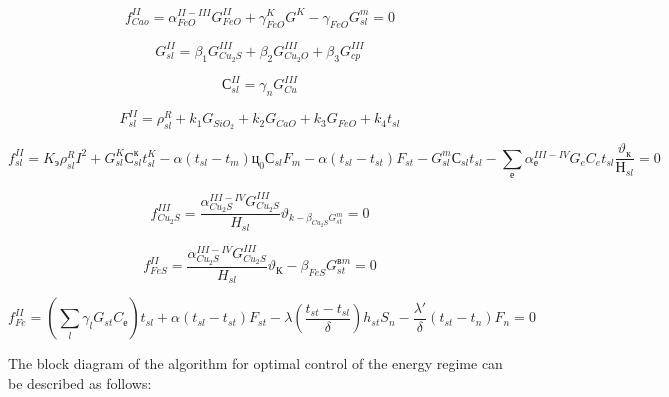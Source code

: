 \begin{equation}
f_{Cao}^{II} = \alpha_{FeO}^{II - III}G_{FeO}^{II} + \gamma_{FeO}^{K}G^{K} - \gamma_{FeO}G_{sl}^{m} = 0
\end{equation}

\begin{equation}
G_{sl}^{II} = \beta_{1}G_{Cu_{2}S}^{III} + \beta_{2}G_{Cu_{2}O}^{III} + \beta_{3}G_{cp}^{III}
\end{equation}

\begin{equation}
С_{sl}^{II} = \gamma_{n}G_{Cu}^{III}
\end{equation}

\begin{equation}
F_{sl}^{II} = \rho_{sl}^{R} + k_{1}G_{SiO_{2}} + k_{2}G_{CaO} + k_{3}G_{FeO} + k_{4}t_{sl}
\end{equation}

\begin{equation}
f_{sl}^{II} = K_{э}\rho_{sl}^{R}I^{2} + G_{sl}^{K}С_{sl}^{к}t_{sl}^{K} - \alpha(t_{sl} - t_{m})ц_{0}С_{sl}F_{m} - \alpha(t_{sl} - t_{st})F_{st} - G_{sl}^{m}С_{sl}t_{sl} - \sum_{е}^{}\alpha_{е}^{III - IV}G_{e}C_{e}t_{sl}\frac{\vartheta_{к}}{Н_{sl}} = 0
\end{equation}

\begin{equation}
f_{Cu_{2}S}^{III} = \frac{\alpha_{Cu_{2}S}^{III - IV}G_{Cu_{2}S}^{III}}{H_{sl}}\vartheta_{k - \beta_{Cu_{2}S}G_{st}^{m}} = 0
\end{equation}

\begin{equation}
f_{FeS}^{II} = \frac{\alpha_{Cu_{2}S}^{III - IV}G_{Cu_{2}S}^{III}}{H_{sl}}\vartheta_{К} - \beta_{FeS}G_{st}^{вm} = 0
\end{equation}

\begin{equation}
f_{Fe}^{II} = (\sum_{l}^{}{\gamma_{l}G_{st}C_{е}})t_{sl} + \alpha(t_{sl} - t_{st})F_{st} - \lambda(\frac{t_{st} - t_{sl}}{\delta})h_{st}S_{n} - \frac{\lambda'}{\delta}(t_{st} - t_{n})F_{n} = 0
\end{equation}

The block diagram of the algorithm for optimal control of the energy
regime can be described as follows:

